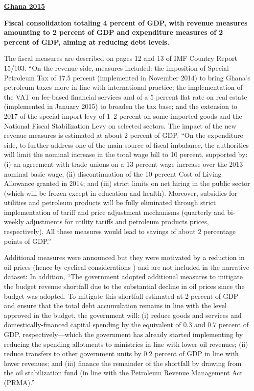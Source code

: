 \textbf{\underline{Ghana 2015}}

\textbf{Fiscal consolidation totaling 4 percent of GDP, with revenue measures amounting to 2 percent of GDP and expenditure measures of 2 percent of GDP, aiming at reducing debt levels.} 

The fiscal measures are described on pages 12 and 13 of IMF Country Report 15/103. “On the revenue side, measures included: the imposition of Special Petroleum Tax of 17.5 percent (implemented in November 2014) to bring Ghana’s petroleum taxes more in line with international practice; the implementation of the VAT on fee-based financial services and of a 5 percent flat rate on real estate (implemented in January 2015) to broaden the tax base; and the extension to 2017 of the special import levy of 1–2 percent on some imported goods and the National Fiscal Stabilization Levy on selected sectors. The impact of the new revenue measures is estimated at about 2 percent of GDP.
“On the expenditure side, to further address one of the main source of fiscal imbalance, the authorities will limit the nominal increase in the total wage bill to 10 percent, supported by: (i) an agreement with trade unions on a 13 percent wage increase over the 2013 nominal basic wage; (ii) discontinuation of the 10 percent Cost of Living Allowance granted in 2014; and (iii) strict limits on net hiring in the public sector (which will be frozen except in education and health). Moreover, subsidies for utilities and petroleum products will be fully eliminated through strict implementation of tariff and price adjustment mechanisms (quarterly and bi-weekly adjustments for utility tariffs and petroleum products prices, respectively). All these measures would lead to savings of about 2 percentage points of GDP.”

Additional measures were announced but they were motivated by a reduction in oil prices (hence by cyclical considerations ) and are not included in the narrative dataset: In addition, “The government adopted additional measures to mitigate the budget revenue shortfall due to the substantial decline in oil prices since the budget was adopted. To mitigate this shortfall estimated at 2 percent of GDP and ensure that the total debt accumulation remains in line with the level approved in the budget, the government will: (i) reduce goods and services and domestically-financed capital spending by the equivalent of 0.3 and 0.7 percent of GDP, respectively—which the government has already started implementing by reducing the spending allotments to ministries in line with lower oil revenues; (ii) reduce transfers to other government units by 0.2 percent of GDP in line with lower revenues; and (iii) finance the remainder of the shortfall by drawing from the oil stabilization fund (in line with the Petroleum Revenue Management Act (PRMA).”

